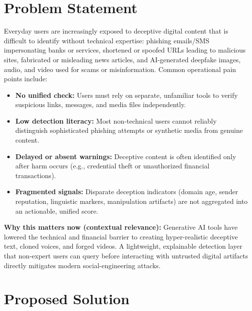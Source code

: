 \documentclass[11pt,a4paper]{article}
\newcommand{\BvrHint}[1]{%
  {\normalfont\normalsize\itshape\hfill #1}}
\begin{document}
\section{Problem Statement}
Everyday users are increasingly exposed to deceptive digital content that is difficult to identify without technical expertise: phishing emails/SMS impersonating banks or services, shortened or spoofed URLs leading to malicious sites, fabricated or misleading news articles, and AI-generated deepfake images, audio, and video used for scams or misinformation. Common operational pain points include:
\begin{itemize}[leftmargin=0.7cm]
    \item \textbf{No unified check:} Users must rely on separate, unfamiliar tools to verify suspicious links, messages, and media files independently.
    \item \textbf{Low detection literacy:} Most non-technical users cannot reliably distinguish sophisticated phishing attempts or synthetic media from genuine content.
    \item \textbf{Delayed or absent warnings:} Deceptive content is often identified only after harm occurs (e.g., credential theft or unauthorized financial transactions).
    \item \textbf{Fragmented signals:} Disparate deception indicators (domain age, sender reputation, linguistic markers, manipulation artifacts) are not aggregated into an actionable, unified score.
\end{itemize}

\textbf{Why this matters now (contextual relevance):} Generative AI tools have lowered the technical and financial barrier to creating hyper-realistic deceptive text, cloned voices, and forged videos. A lightweight, explainable detection layer that non-expert users can query before interacting with untrusted digital artifacts directly mitigates modern social-engineering attacks.

\section{Proposed Solution %
\BvrHint{}}
\end{document}
